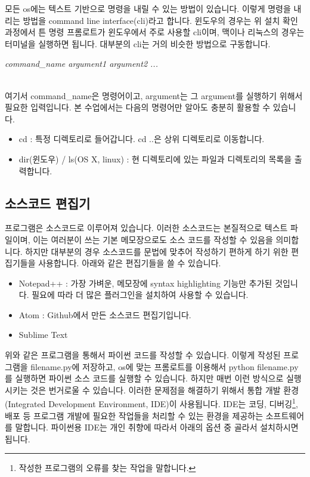 \documentclass[twoside]{article}
\begin{document}
모든 os에는 텍스트 기반으로 명령을 내릴 수 있는 방법이 있습니다. 이렇게 명령을 내리는 방법을 command line interface(cli)라고 합니다. 윈도우의 경우는 위 설치 확인 과정에서 튼 명령 프롬로트가 윈도우에서 주로 사용할 cli이며, 맥이나 리눅스의 경우는 터미널을 실행하면 됩니다.  대부분의 cli는 거의 비슷한 방법으로 구동합니다. \\

\begin{centering} 
\textit{command\_name argument1 argument2 ... }
\end{centering} \\

여기서 command\_name은 명령어이고, argument는 그 argument를 실행하기 위해서 필요한 입력입니다. 본 수업에서는 다음의 명령어만 알아도 충분히 활용할 수 있습니다. 

\begin{itemize}  
\item cd : 특정 디렉토리로 들어갑니다. cd ..은 상위 디렉토리로 이동합니다. 
\item dir(윈도우) / ls(OS X, linux) : 현 디렉토리에 있는 파일과 디렉토리의 목록을 출력합니다.  
\end{itemize}

\subsection{소스코드 편집기}

프로그램은 소스코드로 이루어져 있습니다. 이러한 소스코드는 본질적으로 텍스트 파일이며, 이는 여러분이 쓰는 기본 메모장으로도 소스 코드를 작성할 수 있음을 의미합니다. 하지만 대부분의 경우 소스코드를 문법에 맞추어 작성하기 편하게 하기 위한 편집기들을 사용합니다. 아래와 같은 편집기들을 쓸 수 있습니다. 

\begin{itemize} 
\item Notepad++ : 가장 가벼운, 메모장에 syntax highlighting 기능만 추가된 것입니다. 필요에 따라 더 많은 플러그인을 설치하여 사용할 수 있습니다. 
\item Atom : Github에서 만든 소스코드 편집기입니다. 
\item Sublime Text 
\end{itemize}

위와 같은 프로그램을 통해서 파이썬 코드를 작성할 수 있습니다. 이렇게 작성된 프로그램을 filename.py에 저장하고, os에 맞는 프롬로트를 이용해서 python filename.py를 실행하면 파이썬 소스 코드를 실행할 수 있습니다. 하지만 매번 이런 방식으로 실행시키는 것은 번거로울 수 있습니다. 이러한 문제점을 해결하기 위해서 통합 개발 환경(Integrated Development Environment, IDE)이 사용됩니다. IDE는 코딩, 디버깅\footnote{작성한 프로그램의 오류를 찾는 작업을 말합니다.}, 배포 등 프로그램 개발에 필요한 작업들을 처리할 수 있는 환경을 제공하는 소프트웨어를 말합니다. 파이썬용 IDE는 개인 취향에 따라서 아래의 옵션 중 골라서 설치하시면 됩니다. 
\end{document}
